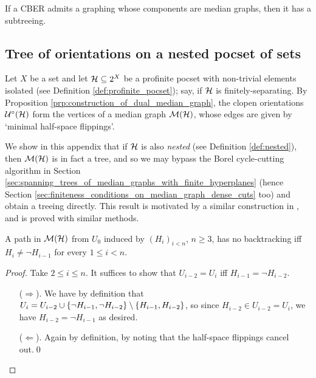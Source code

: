 \documentclass{amsart}
\begin{document}
    \begin{corollary}
        If a CBER admits a graphing whose components are median graphs, then it has a subtreeing.
    \end{corollary}

    \begin{appendices}
        \section{Tree of orientations on a nested pocset of sets}\label{app:tree_of_orientations_on_nested}

        Let $X$ be a set and let $\mathcal{H}\subseteq2^X$ be a profinite pocset with non-trivial elements isolated (see Definition \ref{def:profinite_pocset}); say, if $\mathcal{H}$ is finitely-separating. By Proposition \ref{prp:construction_of_dual_median_graph}, the clopen orientations $\mathcal{U}^\circ(\mathcal{H})$ form the vertices of a median graph $\mathcal{M}(\mathcal{H})$, whose edges are given by `minimal half-space flippings'.

        We show in this appendix that if $\mathcal{H}$ is also \textit{nested} (see Definition \ref{def:nested}), then $\mathcal{M}(\mathcal{H})$ is in fact a tree, and so we may bypass the Borel cycle-cutting algorithm in Section \ref{sec:spanning_trees_of_median_graphs_with_finite_hyperplanes} (hence Section \ref{sec:finiteness_conditions_on_median_graph_dense_cuts} too) and obtain a treeing directly. This result is motivated by a similar construction in \cite{Tse20}, and is proved with similar methods.

        \begin{lemma}\label{lem:no-backtrack}
            A path in $\mathcal{M}(\mathcal{H})$ from $U_0$ induced by $(H_i)_{i<n}$, $n\geq3$, has no backtracking iff $H_i\neq\lnot H_{i-1}$ for every $1\leq i<n$.
        \end{lemma}
        \begin{proof}
            Take $2\leq i\leq n$. It suffices to show that $U_{i-2}=U_i$ iff $H_{i-1}=\lnot H_{i-2}$.
            \begin{itemize}
                \item[($\Rightarrow$).] We have by definition that $U_i=U_{i-2}\cup\{\lnot H_{i-1},\lnot H_{i-2}\}\setminus\left\{H_{i-1},H_{i-2}\right\}$, so since $H_{i-2}\in U_{i-2}=U_i$, we have $H_{i-2}=\lnot H_{i-1}$ as desired.
                \item[($\Leftarrow$).] Again by definition, by noting that the half-space flippings cancel out.\qed
            \end{itemize}
        \end{proof}


\end{appendices}
\end{document}
